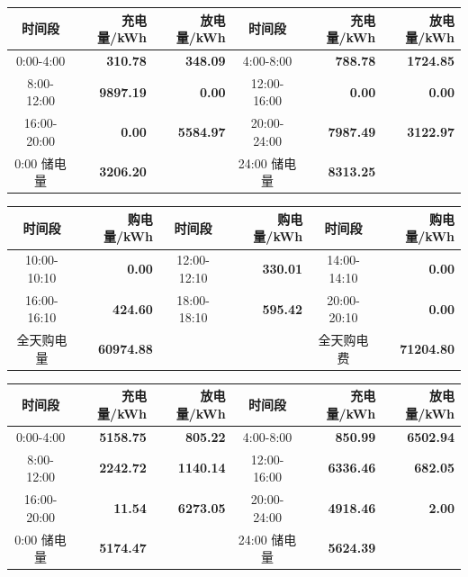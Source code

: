 {\begin{center}
\vspace{0.15\baselineskip}
\begin{tabular}{|c|r|r|c|r|r|}
\hline
时间段 & 充电量/kWh & 放电量/kWh & 时间段 & 充电量/kWh & 放电量/kWh \\
\hline
0:00-4:00 & \textbf{310.78} & \textbf{348.09} & 4:00-8:00 & \textbf{788.78} & \textbf{1724.85} \\
\hline
8:00-12:00 & \textbf{9897.19} & \textbf{0.00} & 12:00-16:00 & \textbf{0.00} & \textbf{0.00} \\
\hline
16:00-20:00 & \textbf{0.00} & \textbf{5584.97} & 20:00-24:00 & \textbf{7987.49} & \textbf{3122.97} \\
\hline
0:00 储电量 & \textbf{3206.20} & & 24:00 储电量 & \textbf{8313.25} & \\
\hline
\end{tabular}
\par{}

\vspace{0.15\baselineskip}
\begin{tabular}{|c|r|c|r|c|r|}
\hline
时间段 & 购电量/kWh & 时间段 & 购电量/kWh & 时间段 & 购电量/kWh \\
\hline
10:00-10:10 & \textbf{0.00} & 12:00-12:10 & \textbf{330.01} & 14:00-14:10 & \textbf{0.00} \\
\hline
16:00-16:10 & \textbf{424.60} & 18:00-18:10 & \textbf{595.42} & 20:00-20:10 & \textbf{0.00} \\
\hline
全天购电量 & \textbf{60974.88} & & & 全天购电费 & \textbf{71204.80} \\
\hline
\end{tabular}
\par{}

\vspace{0.15\baselineskip}
\begin{tabular}{|c|r|r|c|r|r|}
\hline
时间段 & 充电量/kWh & 放电量/kWh & 时间段 & 充电量/kWh & 放电量/kWh \\
\hline
0:00-4:00 & \textbf{5158.75} & \textbf{805.22} & 4:00-8:00 & \textbf{850.99} & \textbf{6502.94} \\
\hline
8:00-12:00 & \textbf{2242.72} & \textbf{1140.14} & 12:00-16:00 & \textbf{6336.46} & \textbf{682.05} \\
\hline
16:00-20:00 & \textbf{11.54} & \textbf{6273.05} & 20:00-24:00 & \textbf{4918.46} & \textbf{2.00} \\
\hline
0:00 储电量 & \textbf{5174.47} & & 24:00 储电量 & \textbf{5624.39} & \\
\hline
\end{tabular}
\par{}


\end{center}}
